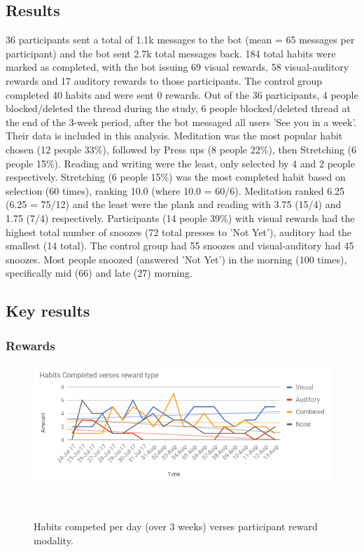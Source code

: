 \documentclass{scaffold/sigchi}
\begin{document}
\subsection{Results}
36 participants sent a total of 1.1k messages to the bot (mean = 65 messages per participant) and the bot sent 2.7k total messages back. 184 total habits were marked as completed, with the bot issuing 69 visual rewards, 58 visual-auditory rewards and 17 auditory rewards to those participants. The control group completed 40 habits and were sent 0 rewards.\newline
\newline
Out of the 36 participants, 4 people blocked/deleted the thread during the study, 6 people blocked/deleted thread at the end of the 3-week period, after the bot messaged all users 'See you in a week'. Their data is included in this analysis.\newline
\newline
Meditation was the most popular habit chosen (12 people 33\%), followed by Press ups (8 people 22\%), then Stretching (6 people 15\%). Reading and writing were the least, only selected by 4 and 2 people respectively.\newline
\newline
Stretching (6 people 15\%) was the most completed habit based on selection (60 times), ranking 10.0 (where 10.0 = 60/6). Meditation ranked 6.25 (6.25 = 75/12) and the least were the plank and reading with 3.75 (15/4) and 1.75 (7/4) respectively.\newline
\newline
Participants (14 people 39\%) with visual rewards had the highest total number of snoozes (72 total presses to 'Not Yet'), auditory had the smallest (14 total). The control group had 55 snoozes and visual-auditory had 45 snoozes. Most people snoozed (answered 'Not Yet') in the morning (100 times), specifically mid (66) and late (27) morning.

\subsection{Key results}

\subsubsection{Rewards}


\begin{figure}
  \centering
  \includegraphics[width=1\columnwidth]{figures/habitscompleted-v-rewards.png}
  \caption{Habits competed per day (over 3 weeks) verses participant reward modality.}~\label{fig:habits_v_rewards}
\end{figure}
\end{document}
